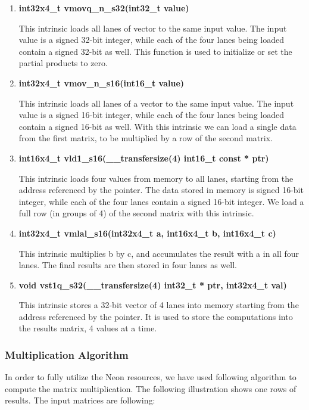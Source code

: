 \begin{enumerate}
\item \textbf{int32x4\_t  vmovq\_n\_s32(int32\_t value)}

This intrinsic loads all lanes of vector to the same input value. 
The input value is a signed 32-bit integer, 
while each of the four lanes being loaded contain a signed 32-bit as well. This function is used to initialize or set the partial products to zero.

\item \textbf{int32x4\_t  vmov\_n\_s16(int16\_t value)}

This intrinsic loads all lanes of a vector to the same input value. 
The input value is a signed 16-bit integer, 
while each of the four lanes being loaded contain a signed 16-bit as well. With this intrinsic we can load a single data from the first matrix, to be multiplied by a row of the second matrix.

\item \textbf{int16x4\_t   vld1\_s16(\_\_transfersize(4) int16\_t const * ptr)}

This intrinsic loads four values from memory to all lanes, starting from the address referenced by the pointer.
The data stored in memory is signed 16-bit integer, 
while each of the four lanes contain a signed 16-bit integer. We load a full row (in groups of 4) of the second matrix with this intrinsic.

\item \textbf{int32x4\_t   vmlal\_s16(int32x4\_t a, int16x4\_t b, int16x4\_t c)}

This intrinsic multiplies b by c, and accumulates the result with a in all four lanes. The final results are then stored in four lanes as well.


\item \textbf{void  vst1q\_s32(\_\_transfersize(4) int32\_t * ptr, int32x4\_t val)}

This intrinsic stores a 32-bit vector of 4 lanes into memory starting from the address referenced by the pointer. It is used to store the computations into the results matrix, 4 values at a time.

\end{enumerate}

\subsubsection{Multiplication Algorithm}

In order to fully utilize the Neon resources, we have used following algorithm to compute the matrix multiplication. The following illustration shows one rows of results.
The input matrices are following:

